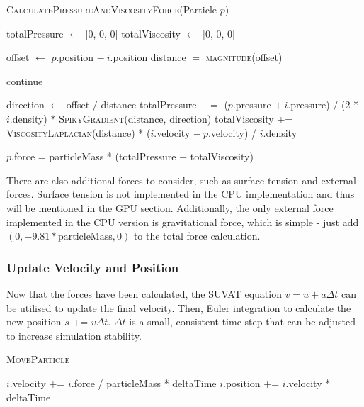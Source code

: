 \documentclass[a4paper, 12pt]{article}
\begin{document}
    \begin{algorithm}[H]
        \caption{\textsc{CalculatePressureAndViscosityForce}(Particle $p$)}

        \begin{algorithmic}[1]
            \State totalPressure $\gets$ [0, 0, 0]
            \State totalViscosity $\gets$ [0, 0, 0]

                \State offset $\gets$ $p$.position $-\ i$.position
                \State distance $=$ \textsc{magnitude}(offset)

                    continue
                \EndIf

                \State direction $\gets$ offset $/$ distance
                \State totalPressure $-=$ ($p$.pressure $+\ i$.pressure) $/$ (2 * $i$.density) $*$ \textsc{SpikyGradient}(distance, direction)
                \State totalViscosity += \textsc{ViscosityLaplacian}(distance) *
                \Statex \hspace{\algorithmicindent} ($i$.velocity $-\ p$.velocity) / $i$.density
            \EndFor
            
            \State $p$.force = particleMass * (totalPressure + totalViscosity)
        \end{algorithmic}

    \end{algorithm}

    There are also additional forces to consider, such as surface tension and external forces. Surface tension is not implemented in the CPU implementation and thus will be mentioned in the GPU section. Additionally, the only external force implemented in the CPU version is gravitational force, which is simple - just add $(0, -9.81 * \text{particleMass}, 0)$ to the total force calculation.

    \subsubsection{Update Velocity and Position}
    Now that the forces have been calculated, the SUVAT equation $v = u + a\Delta{t}$ can be utilised to update the final velocity. Then, Euler integration to calculate the new position $s$ += $v\Delta{t}$. $\Delta{t}$ is a small, consistent time step that can be adjusted to increase simulation stability.

    \begin{algorithm}[H]
        \caption{\textsc{MoveParticle}}
    
        \begin{algorithmic}[1]
                \State $i$.velocity += $i$.force / particleMass * deltaTime
                \State $i$.position += $i$.velocity * deltaTime
            \EndFor
        \end{algorithmic}

    \end{algorithm}
\end{document}
